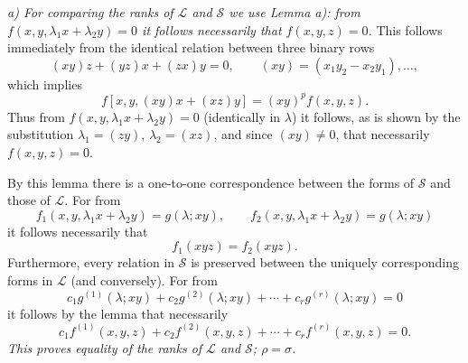 \documentclass[11pt]{article}
\begin{document}
\emph{a) For comparing the ranks of $\mathcal L$ and $\mathcal S$ we use Lemma a): from $f(x,y,\lambda_1x+\lambda_2y)=0$ it follows necessarily that $f(x,y,z)=0$.} This follows immediately from the identical relation between three binary rows
\[
  (xy)z+(yz)x+(zx)y=0,
  \qquad (xy)=(x_1y_2-x_2y_1),\ldots,
\]
which implies
\[
  f[x,y,(xy)x+(xz)y]=(xy)^p f(x,y,z).
\]
Thus from $f(x,y,\lambda_1x+\lambda_2y)=0$ (identically in $\lambda$) it follows, as is shown by the substitution $\lambda_1=(zy)$, $\lambda_2=(xz)$, and since $(xy)\ne0$, that necessarily $f(x,y,z)=0$.

By this lemma there is a one-to-one correspondence between the forms of $\mathcal S$ and those of $\mathcal L$. For from
\[
  f_1(x,y,\lambda_1x+\lambda_2y)=g(\lambda;xy),\qquad
  f_2(x,y,\lambda_1x+\lambda_2y)=g(\lambda;xy)
\]
it follows necessarily that
\[
  f_1(xyz)=f_2(xyz).
\]
Furthermore, every relation in $\mathcal S$ is preserved between the uniquely corresponding forms in $\mathcal L$ (and conversely). For from
\[
  c_1g^{(1)}(\lambda;xy)+c_2g^{(2)}(\lambda;xy)+\cdots+c_rg^{(r)}(\lambda;xy)=0
\]
it follows by the lemma that necessarily
\[
  c_1f^{(1)}(x,y,z)+c_2f^{(2)}(x,y,z)+\cdots+c_rf^{(r)}(x,y,z)=0.
\]
\emph{This proves equality of the ranks of $\mathcal L$ and $\mathcal S$; $\rho=\sigma$.}
\end{document}
